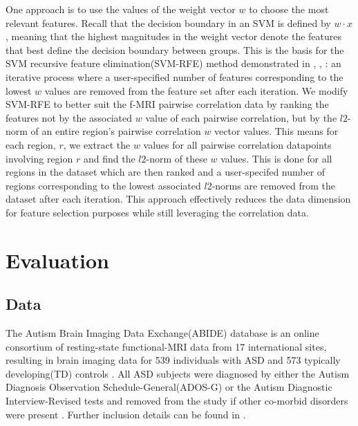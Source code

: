\documentclass{llncs}
\begin{document}
One approach is to use the values of the weight vector $w$ to choose the most relevant features.  Recall that the decision boundary in an SVM is defined by $w \cdot x$, meaning that the highest magnitudes in the weight vector denote the features that best define the decision boundary between groups. This is the basis for the SVM recursive feature elimination(SVM-RFE) method demonstrated in \cite{guyon2002gene}, \cite{abide}, \cite{ecker2010}: an iterative process where a user-specified number of features corresponding to the lowest $w$ values are removed from the feature set after each iteration. We modify SVM-RFE to better suit the f-MRI pairwise correlation data by ranking the features not by the associated $w$ value of each pairwise correlation, but by the $l2$-norm of an entire region's pairwise correlation $w$ vector values. This means for each region, $r$, we extract the $w$ values for all pairwise correlation datapoints involving region $r$ and find the $l2$-norm of these $w$ values. This is done for all regions in the dataset which are then ranked and a user-specifed number of regions corresponding to the lowest associated $l2$-norms are removed from the dataset after each iteration.   This approach effectively reduces the data dimension for feature selection purposes while still leveraging the correlation data.

\section{Evaluation}
\subsection{Data}
The Autism Brain Imaging Data Exchange(ABIDE) database is an online consortium of resting-state functional-MRI data from 17 international sites, resulting in brain imaging data for 539 individuals with ASD and 573 typically developing(TD)  controls \cite{abide}. All ASD subjects were diagnosed by either the Autism Diagnosis Observation Schedule-General(ADOS-G) or the Autism Diagnostic Interview-Revised tests and removed from the study if other co-morbid disorders were present \cite{lordADOS} \cite{lordADIR} \cite{abide}.  Further inclusion details can be found in \cite{abide}. 
\end{document}
